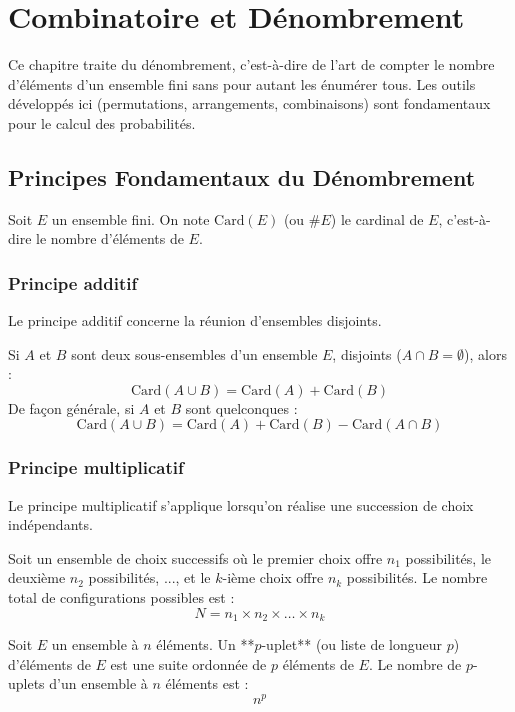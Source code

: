 \chapter{Combinatoire et Dénombrement}

Ce chapitre traite du dénombrement, c'est-à-dire de l'art de compter le nombre d'éléments d'un ensemble fini sans pour autant les énumérer tous. Les outils développés ici (permutations, arrangements, combinaisons) sont fondamentaux pour le calcul des probabilités.

\section{Principes Fondamentaux du Dénombrement}

Soit $E$ un ensemble fini. On note $\text{Card}(E)$ (ou $\#E$) le cardinal de $E$, c'est-à-dire le nombre d'éléments de $E$.

\subsection{Principe additif}

Le principe additif concerne la réunion d'ensembles disjoints.

\begin{theoreme}
Si $A$ et $B$ sont deux sous-ensembles d'un ensemble $E$, disjoints ($A \cap B = \emptyset$), alors :
\[
\text{Card}(A \cup B) = \text{Card}(A) + \text{Card}(B)
\]
De façon générale, si $A$ et $B$ sont quelconques :
\[
\text{Card}(A \cup B) = \text{Card}(A) + \text{Card}(B) - \text{Card}(A \cap B)
\]
\end{theoreme}

\subsection{Principe multiplicatif}

Le principe multiplicatif s'applique lorsqu'on réalise une succession de choix indépendants.

\begin{theoreme}
Soit un ensemble de choix successifs où le premier choix offre $n_1$ possibilités, le deuxième $n_2$ possibilités, ..., et le $k$-ième choix offre $n_k$ possibilités.
Le nombre total de configurations possibles est :
\[
N = n_1 \times n_2 \times \dots \times n_k
\]
\end{theoreme}

\begin{definition}
Soit $E$ un ensemble à $n$ éléments. Un **$p$-uplet** (ou liste de longueur $p$) d'éléments de $E$ est une suite ordonnée de $p$ éléments de $E$.
Le nombre de $p$-uplets d'un ensemble à $n$ éléments est :
\[
n^p
\]
\end{definition}

